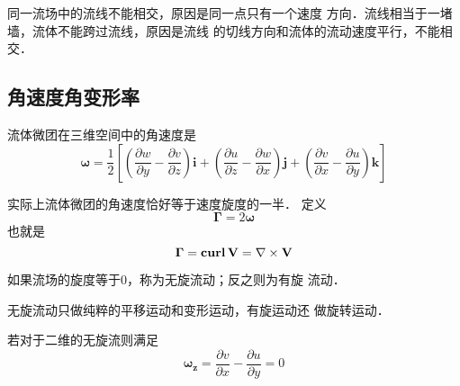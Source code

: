 \begin{note}
	同一流场中的流线不能相交，原因是同一点只有一个速度
	方向．流线相当于一堵墙，流体不能跨过流线，原因是流线
	的切线方向和流体的流动速度平行，不能相交．
\end{note}

\subsection{角速度\quad 角变形率}
流体微团在三维空间中的角速度是
\[
	\mathbf{\omega}=\frac{1}{2 }\left[
		\left( \frac{\partial w}{\partial y}-
		\frac{\partial v}{\partial z}\right)\mathbf{i}
		+\left( \frac{\partial u}{\partial z}-
		\frac{\partial w}{\partial x}\right) \mathbf{j}+
		\left( \frac{\partial v}{\partial x}-
		\frac{\partial u}{\partial y}\right) \mathbf{k}
		\right]
\]

实际上流体微团的角速度恰好等于速度旋度的一半．
定义
\[
	\mathbf{\Gamma} =2\mathbf{\omega}
\]
也就是
\[
	\mathbf{\Gamma} =\mathbf{curl}\, \mathbf{V}=\nabla
	\times \mathbf{V}
\]

如果流场的旋度等于0，称为无旋流动；反之则为有旋
流动．
\begin{note}
	无旋流动只做纯粹的平移运动和变形运动，有旋运动还
	做旋转运动．
\end{note}
若对于二维的无旋流则满足
\[
	\mathbf{\omega_z}= \frac{\partial v}{\partial x}-
	\frac{\partial u}{\partial y}=0
\]

